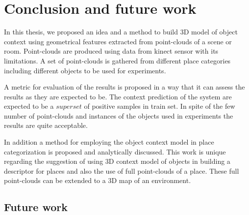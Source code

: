 \chapter{Conclusion and future work}
\label{Conclusion.ch}
In this thesis, we proposed an idea and a method to build 3D model of object context using geometrical features extracted
from point-clouds of a scene or room.
Point-clouds are produced using data from kinect sensor with its limitations.
A set of point-clouds is gathered from different place categories including different objects to be used for experiments.

A metric for evaluation of the results is proposed in a way that it can assess the results as they are expected to be.
The context prediction of the system are expected to be a $superset$ of positive samples in train set.
In spite of the few number of point-clouds and instances of the objects used in experiments the results are quite acceptable. 

In addition a method for employing the object context model in place categorization is proposed and analytically discussed.
This work is unique regarding the suggestion of using 3D context model of objects in building a descriptor for places and also the use of full 
point-clouds of a place. 
These full point-clouds can be extended to a 3D map of an environment.

\section{Future work}

